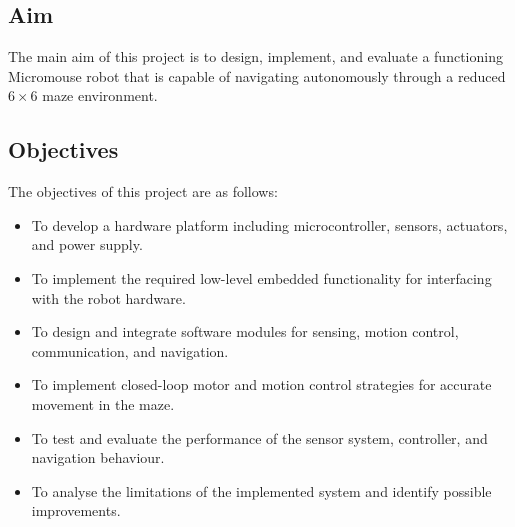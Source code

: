 \subsection{Aim}
The main aim of this project is to design, implement, and evaluate a functioning Micromouse robot that is capable of navigating autonomously through a reduced $6 \times 6$ maze environment.

\subsection{Objectives}
The objectives of this project are as follows:
\begin{itemize}
    \item To develop a hardware platform including microcontroller, sensors, actuators, and power supply.
    \item To implement the required low-level embedded functionality for interfacing with the robot hardware.
    \item To design and integrate software modules for sensing, motion control, communication, and navigation.
    \item To implement closed-loop motor and motion control strategies for accurate movement in the maze.
    \item To test and evaluate the performance of the sensor system, controller, and navigation behaviour.
    \item To analyse the limitations of the implemented system and identify possible improvements.
\end{itemize}
